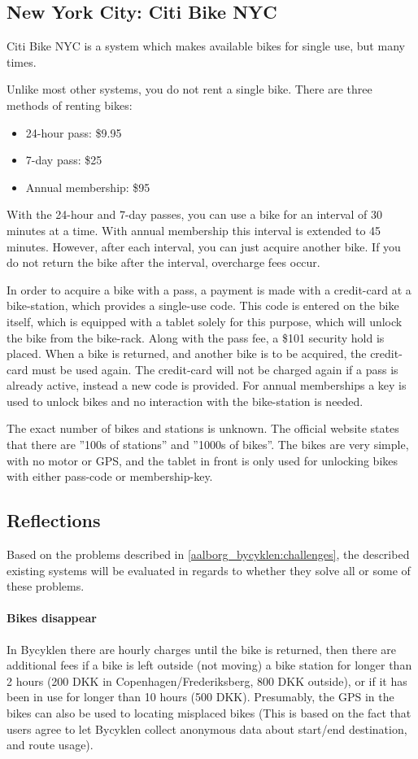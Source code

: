 \subsection{New York City: Citi Bike NYC}
Citi Bike NYC\cite{nyc_citibike} is a system which makes available bikes for single use, but many times.

Unlike most other systems, you do not rent a single bike.
There are three methods of renting bikes:

\begin{itemize}
\item 24-hour pass: \$9.95
\item 7-day pass: \$25
\item Annual membership: \$95
\end{itemize}

With the 24-hour and 7-day passes, you can use a bike for an interval of 30 minutes at a time.
With annual membership this interval is extended to 45 minutes.
However, after each interval, you can just acquire another bike.
If you do not return the bike after the interval, overcharge fees occur.

In order to acquire a bike with a pass, a payment is made with a credit-card at a bike-station, which provides a single-use code.
This code is entered on the bike itself, which is equipped with a tablet solely for this purpose, which will unlock the bike from the bike-rack.
Along with the pass fee, a \$101 security hold is placed.
When a bike is returned, and another bike is to be acquired, the credit-card must be used again.
The credit-card will not be charged again if a pass is already active, instead a new code is provided.
For annual memberships a key is used to unlock bikes and no interaction with the bike-station is needed.

The exact number of bikes and stations is unknown.
The official website states that there are ''100s of stations'' and ''1000s of bikes''.
The bikes are very simple, with no motor or GPS, and the tablet in front is only used for unlocking bikes with either pass-code or membership-key.

\subsection{Reflections}
Based on the problems described in \cref{aalborg_bycyklen:challenges}, the described existing systems will be evaluated in regards to whether they solve all or some of these problems.

\paragraph{Bikes disappear}
In Bycyklen there are hourly charges until the bike is returned, then there are additional fees if a bike is left outside (not moving) a bike station for longer than 2 hours (200 DKK in Copenhagen/Frederiksberg, 800 DKK outside), or if it has been in use for longer than 10 hours (500 DKK).
Presumably, the GPS in the bikes can also be used to locating misplaced bikes (This is based on the fact that users agree to let Bycyklen collect anonymous data about start/end destination, and route usage).

